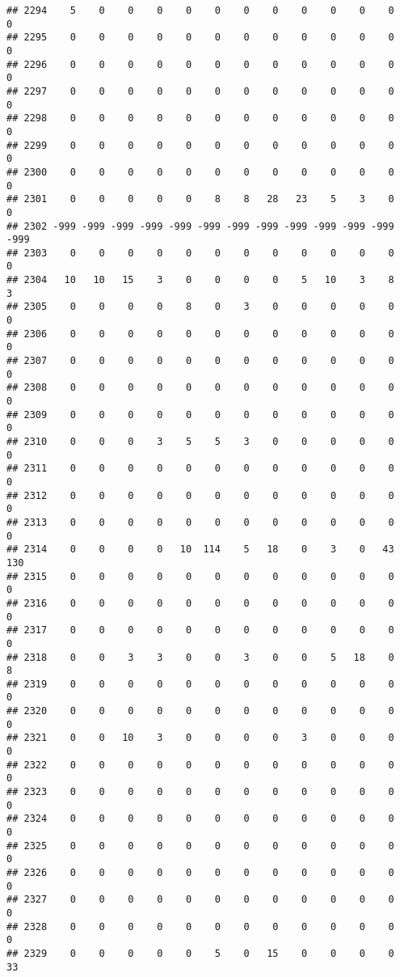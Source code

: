 \documentclass[]{article}
\begin{document}
\begin{verbatim}
## 2294    5    0    0    0    0    0    0    0    0    0    0    0    0
## 2295    0    0    0    0    0    0    0    0    0    0    0    0    0
## 2296    0    0    0    0    0    0    0    0    0    0    0    0    0
## 2297    0    0    0    0    0    0    0    0    0    0    0    0    0
## 2298    0    0    0    0    0    0    0    0    0    0    0    0    0
## 2299    0    0    0    0    0    0    0    0    0    0    0    0    0
## 2300    0    0    0    0    0    0    0    0    0    0    0    0    0
## 2301    0    0    0    0    0    8    8   28   23    5    3    0    0
## 2302 -999 -999 -999 -999 -999 -999 -999 -999 -999 -999 -999 -999 -999
## 2303    0    0    0    0    0    0    0    0    0    0    0    0    0
## 2304   10   10   15    3    0    0    0    0    5   10    3    8    3
## 2305    0    0    0    0    8    0    3    0    0    0    0    0    0
## 2306    0    0    0    0    0    0    0    0    0    0    0    0    0
## 2307    0    0    0    0    0    0    0    0    0    0    0    0    0
## 2308    0    0    0    0    0    0    0    0    0    0    0    0    0
## 2309    0    0    0    0    0    0    0    0    0    0    0    0    0
## 2310    0    0    0    3    5    5    3    0    0    0    0    0    0
## 2311    0    0    0    0    0    0    0    0    0    0    0    0    0
## 2312    0    0    0    0    0    0    0    0    0    0    0    0    0
## 2313    0    0    0    0    0    0    0    0    0    0    0    0    0
## 2314    0    0    0    0   10  114    5   18    0    3    0   43  130
## 2315    0    0    0    0    0    0    0    0    0    0    0    0    0
## 2316    0    0    0    0    0    0    0    0    0    0    0    0    0
## 2317    0    0    0    0    0    0    0    0    0    0    0    0    0
## 2318    0    0    3    3    0    0    3    0    0    5   18    0    8
## 2319    0    0    0    0    0    0    0    0    0    0    0    0    0
## 2320    0    0    0    0    0    0    0    0    0    0    0    0    0
## 2321    0    0   10    3    0    0    0    0    3    0    0    0    0
## 2322    0    0    0    0    0    0    0    0    0    0    0    0    0
## 2323    0    0    0    0    0    0    0    0    0    0    0    0    0
## 2324    0    0    0    0    0    0    0    0    0    0    0    0    0
## 2325    0    0    0    0    0    0    0    0    0    0    0    0    0
## 2326    0    0    0    0    0    0    0    0    0    0    0    0    0
## 2327    0    0    0    0    0    0    0    0    0    0    0    0    0
## 2328    0    0    0    0    0    0    0    0    0    0    0    0    0
## 2329    0    0    0    0    0    5    0   15    0    0    0    0   33

\end{verbatim}
\end{document}
